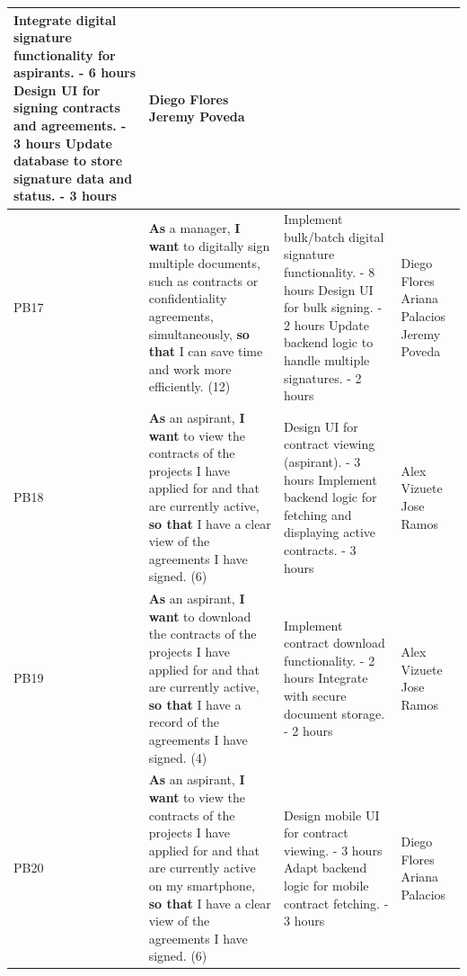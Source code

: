 \documentclass{scrreprt}
\begin{document}
\begin{longtable}{|p{1.5cm}|p{5.5cm}|p{4.5cm}|p{3cm}|}
	Integrate digital signature functionality for aspirants. - 6 hours \newline
	Design UI for signing contracts and agreements. - 3 hours \newline
	Update database to store signature data and status. - 3 hours & 
	Diego Flores \newline
	Jeremy Poveda \\ \hline 
	
	
	PB17 & \textbf{As} a manager, \textbf{I want} to digitally sign multiple documents, such as contracts or confidentiality agreements, simultaneously, \textbf{so that} I can save time and work more efficiently. (12) &
	
	Implement bulk/batch digital signature functionality. - 8 hours \newline
	Design UI for bulk signing. - 2 hours \newline
	Update backend logic to handle multiple signatures. - 2 hours &
	Diego Flores \newline
	Ariana Palacios \newline
	Jeremy Poveda \\ \hline
	
	PB18 & \textbf{As} an aspirant, \textbf{I want} to view the contracts of the projects I have applied for and that are currently active, \textbf{so that} I have a clear view of the agreements I have signed. (6) &
	Design UI for contract viewing (aspirant). - 3 hours \newline
	Implement backend logic for fetching and displaying active contracts. - 3 hours &
	Alex Vizuete \newline
	Jose Ramos \\ \hline
	
	PB19 & \textbf{As} an aspirant, \textbf{I want} to download the contracts of the projects I have applied for and that are currently active, \textbf{so that} I have a record of the agreements I have signed. (4) &
	Implement contract download functionality. - 2 hours \newline
	Integrate with secure document storage. - 2 hours &
	Alex Vizuete \newline
	Jose Ramos \\ \hline
	
	PB20 & \textbf{As} an aspirant, \textbf{I want} to view the contracts of the projects I have applied for and that are currently active on my smartphone, \textbf{so that} I have a clear view of the agreements I have signed. (6) &
	Design mobile UI for contract viewing. - 3 hours \newline
	Adapt backend logic for mobile contract fetching. - 3 hours &
	Diego Flores \newline
	Ariana Palacios \\ \hline
	

\end{longtable}
\end{document}
